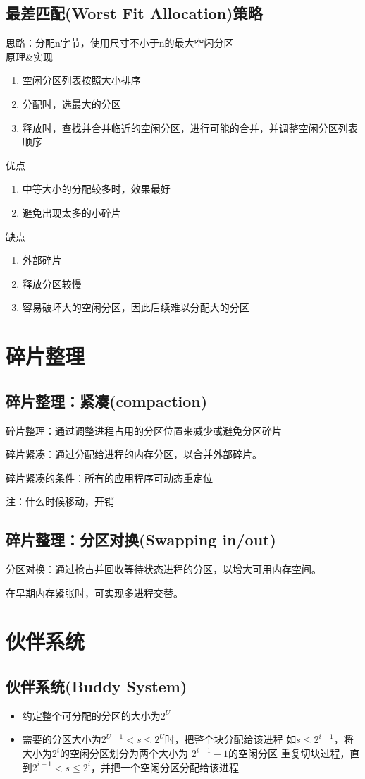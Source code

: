 \subsection{最差匹配(Worst Fit Allocation)策略}
思路：分配n字节，使用尺寸不小于n的最大空闲分区\\
原理\&实现
\begin{enumerate}
	\item 空闲分区列表按照大小排序
	\item 分配时，选最大的分区
	\item 释放时，查找并合并临近的空闲分区，进行可能的合并，并调整空闲分区列表顺序
\end{enumerate}
优点
\begin{enumerate}
	\item 中等大小的分配较多时，效果最好
	\item 避免出现太多的小碎片
\end{enumerate}
缺点
\begin{enumerate}
	\item 外部碎片
	\item 释放分区较慢
	\item 容易破坏大的空闲分区，因此后续难以分配大的分区
\end{enumerate}
\section{碎片整理}
\subsection{碎片整理：紧凑(compaction)}
碎片整理：通过调整进程占用的分区位置来减少或避免分区碎片\par
碎片紧凑：通过分配给进程的内存分区，以合并外部碎片。\par
碎片紧凑的条件：所有的应用程序可动态重定位\par
注：什么时候移动，开销
\subsection{碎片整理：分区对换(Swapping in/out)}
分区对换：通过抢占并回收等待状态进程的分区，以增大可用内存空间。\par
在早期内存紧张时，可实现多进程交替。

\section{伙伴系统}
\subsection{伙伴系统(Buddy System)}
\begin{itemize}
	\item 约定整个可分配的分区的大小为$2^U$
	\item 需要的分区大小为$2^{U-1}<s\le2^U$时，把整个块分配给该进程
	\subitem 如$s\le2^{i-1}$，将大小为$2^i$的空闲分区划分为两个大小为
	$2^{i-1}-1$的空闲分区
	\subitem 重复切块过程，直到$2^{i-1}<s\le2^i$，并把一个空闲分区分配给该进程
\end{itemize}
